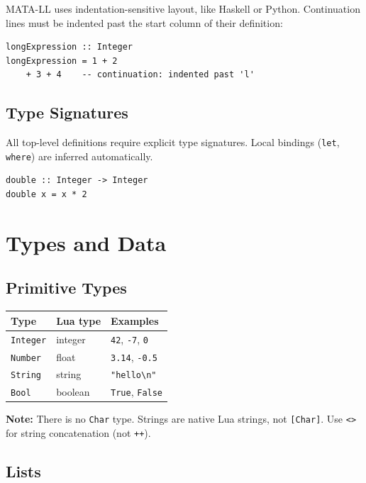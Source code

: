 \documentclass[11pt,a4paper]{article}
\newenvironment{note}{%
  \def\FrameCommand{\fboxsep=3mm \colorbox{notebg}}%
  \MakeFramed{\advance\hsize-\width \FrameRestore}%
  \noindent\textbf{Note:} }%
  {\endMakeFramed}
\begin{document}
MATA-LL uses indentation-sensitive layout, like Haskell or Python.
Continuation lines must be indented past the start column of their
definition:

\begin{lstlisting}
longExpression :: Integer
longExpression = 1 + 2
    + 3 + 4    -- continuation: indented past 'l'
\end{lstlisting}

\subsection{Type Signatures}

All top-level definitions require explicit type signatures.  Local bindings
(\texttt{let}, \texttt{where}) are inferred automatically.

\begin{lstlisting}
double :: Integer -> Integer
double x = x * 2
\end{lstlisting}

\section{Types and Data}

\subsection{Primitive Types}

\begin{tabular}{@{}lll@{}}
\toprule
\textbf{Type} & \textbf{Lua type} & \textbf{Examples} \\
\midrule
\texttt{Integer} & integer     & \texttt{42}, \texttt{-7}, \texttt{0} \\
\texttt{Number}  & float       & \texttt{3.14}, \texttt{-0.5} \\
\texttt{String}  & string      & \texttt{"hello\textbackslash n"} \\
\texttt{Bool}    & boolean     & \texttt{True}, \texttt{False} \\
\bottomrule
\end{tabular}

\begin{note}
There is no \texttt{Char} type.  Strings are native Lua strings, not
\texttt{[Char]}.  Use \texttt{<>} for string concatenation (not \texttt{++}).
\end{note}

\subsection{Lists}
\end{document}
